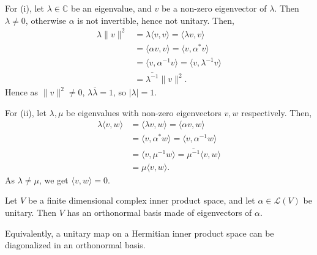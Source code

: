 \documentclass[12pt]{article}
\begin{document}
\begin{proofbox}
	For (i), let $\lambda \in \mathbb{C}$ be an eigenvalue, and $v$ be a non-zero eigenvector of $\lambda$. Then $\lambda \neq 0$, otherwise $\alpha$ is not invertible, hence not unitary. Then,
	\begin{align*}
		\lambda\|v\|^2 &= \lambda \langle v, v \rangle = \langle \lambda v, v \rangle \\
			       &= \langle \alpha v, v \rangle = \langle v, \alpha^{\ast} v \rangle \\
			       &= \langle v, \alpha^{-1} v \rangle = \langle v, \lambda^{-1} v \rangle \\
			       &= \overline{\lambda^{-1}} \|v\|^2.
	\end{align*}
	Hence as $\|v\|^2 \neq 0$, $\lambda \overline{\lambda} = 1$, so $|\lambda| = 1$.

	For (ii), let $\lambda, \mu$ be eigenvalues with non-zero eigenvectors $v, w$ respectively. Then,
	\begin{align*}
		\lambda \langle v, w \rangle &= \langle \lambda v, w \rangle = \langle \alpha v, w \rangle \\
					     &= \langle v, \alpha^{\ast} w \rangle = \langle v, \alpha^{-1} w \rangle \\
					     &= \langle v, \mu^{-1} w \rangle = \overline{\mu^{-1}} \langle v, w \rangle \\
					     &= \mu \langle v, w \rangle.
	\end{align*}
	As $\lambda \neq \mu$, we get $\langle v, w \rangle = 0$.
\end{proofbox}

\begin{theorem}
	Let $V$ be a finite dimensional complex inner product space, and let $\alpha \in \mathcal{L}(V)$ be unitary. Then $V$ has an orthonormal basis made of eigenvectors of $\alpha$.
\end{theorem}

Equivalently, a unitary map on a Hermitian inner product space can be diagonalized in an orthonormal basis.
\end{document}
